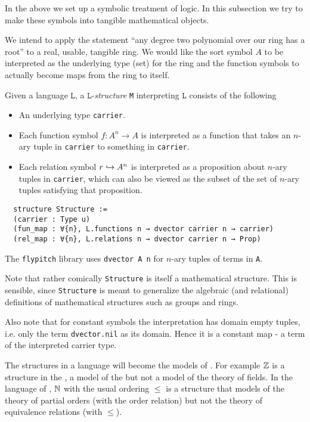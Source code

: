 In the above we set up a symbolic treatment of logic.
In this subsection we try to make these symbols into tangible mathematical objects.

We intend to apply the statement
``any degree two polynomial over our ring has a root''
to a real, usable, tangible ring.
We would like the sort symbol $A$ to be interpreted as the underlying type (set)
for the ring and the function symbols to actually become maps from the ring to itself.

\begin{dfn}[Structures]
    Given a language $\texttt{L}$, a $\texttt{L}$-\textit{structure} \texttt{M}
    interpreting $\texttt{L}$ consists of the following
    \begin{itemize}
      \item An underlying type \texttt{carrier}.
      \item Each function symbol $f : A^{n} \to A$ is interpreted as a
            function that takes an $n$-ary tuple in \texttt{carrier}
            to something in \texttt{carrier}.
      \item Each relation symbol $r \hookrightarrow A^{n}$
            is interpreted as a proposition about $n$-ary tuples in \texttt{carrier},
            which can also be viewed as the subset of the set of $n$-ary tuples
            satisfying that proposition.
    \end{itemize}

  \begin{lstlisting}
  structure Structure :=
  (carrier : Type u)
  (fun_map : ∀{n}, L.functions n → dvector carrier n → carrier)
  (rel_map : ∀{n}, L.relations n → dvector carrier n → Prop)\end{lstlisting}

  The \texttt{flypitch} library uses \texttt{dvector A n} for $n$-ary tuples of terms in \texttt{A}.

  Note that rather comically \texttt{Structure} is itself a mathematical structure.
  This is sensible, since \texttt{Structure} is meant to generalize the algebraic
  (and relational) definitions of mathematical structures such as groups and rings.

  Also note that for constant symbols the interpretation has domain empty tuples,
  i.e. only the term \texttt{dvector.nil} as its domain. Hence it is a constant map
  - a term of the interpreted carrier type.
\end{dfn}

The structures in a language will become the models of .
For example $\mathbb{Z}$ is a structure in the ,
a model of the  but not a model of the theory of fields.
In the language of ,
$\mathbb{N}$ with the usual ordering $\leq$ is a structure that models of
the theory of partial orders (with the order relation)
but not the theory of equivalence relations (with $\le$).

